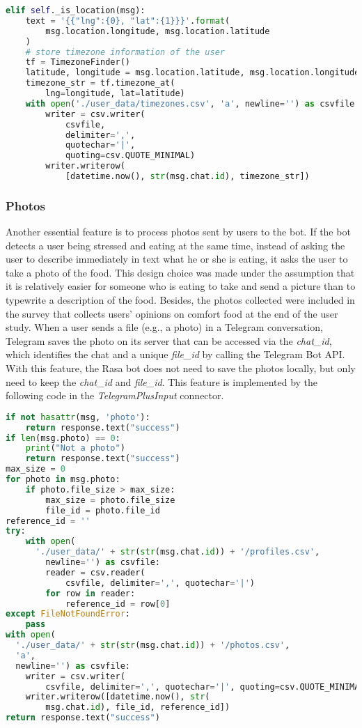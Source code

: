 \begin{lstlisting}[language=Python]
elif self._is_location(msg):
    text = '{{"lng":{0}, "lat":{1}}}'.format(
        msg.location.longitude, msg.location.latitude
    )
    # store timezone information of the user
    tf = TimezoneFinder()
    latitude, longitude = msg.location.latitude, msg.location.longitude
    timezone_str = tf.timezone_at(
        lng=longitude, lat=latitude)
    with open('./user_data/timezones.csv', 'a', newline='') as csvfile:
        writer = csv.writer(
            csvfile,
            delimiter=',',
            quotechar='|',
            quoting=csv.QUOTE_MINIMAL)
        writer.writerow(
            [datetime.now(), str(msg.chat.id), timezone_str])
\end{lstlisting}

\subsubsection{Photos}
Another essential feature is to process photos sent by users to the bot. If the bot detects a user being stressed and eating at the same time, instead of asking the user to describe immediately in text what he or she is eating, it asks the user to take a photo of the food. This design choice was made under the assumption that it is relatively easier for someone who is eating to take and send a picture than to typewrite a description of the food. Besides, the photos collected were included in the survey that collects users' opinions on comfort food at the end of the user study. When a user sends a file (e.g., a photo) in a Telegram conversation, Telegram saves the photo on its server that can be accessed via the \emph{chat\_id}, which identifies the chat and a unique \emph{file\_id} by calling the Telegram Bot API. With this feature, the Rasa bot does not need to save the photos locally, but only need to keep the \emph{chat\_id} and \emph{file\_id}. This feature is implemented by the following code in the \emph{TelegramPlusInput} connector. \bigskip

\begin{lstlisting}[language=Python]
if not hasattr(msg, 'photo'):
    return response.text("success")
if len(msg.photo) == 0:
    print("Not a photo")
    return response.text("success")
max_size = 0
for photo in msg.photo:
    if photo.file_size > max_size:
        max_size = photo.file_size
        file_id = photo.file_id
reference_id = ''
try:
    with open(
      './user_data/' + str(str(msg.chat.id)) + '/profiles.csv',
        newline='') as csvfile:
        reader = csv.reader(
            csvfile, delimiter=',', quotechar='|')
        for row in reader:
            reference_id = row[0]
except FileNotFoundError:
    pass
with open(
  './user_data/' + str(str(msg.chat.id)) + '/photos.csv',
  'a',
  newline='') as csvfile:
    writer = csv.writer(
        csvfile, delimiter=',', quotechar='|', quoting=csv.QUOTE_MINIMAL)
    writer.writerow([datetime.now(), str(
        msg.chat.id), file_id, reference_id])
return response.text("success")
\end{lstlisting}

